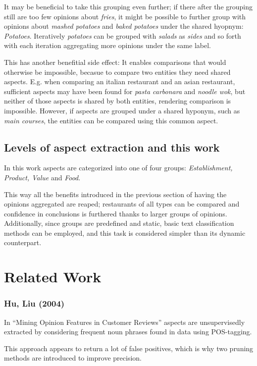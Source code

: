 \documentclass[a4paper,11pt]{kth-mag}
\begin{document}

It may be beneficial to take this grouping even further;
if there after the grouping still are too few opinions about \emph{fries},
it might be possible to further group with opinions about \emph{mashed potatoes}
and \emph{baked potatoes} under the shared hyopnym: \emph{Potatoes}.
Iteratively \emph{potatoes} can be grouped with \emph{salads} as \emph{sides}
and so forth with each iteration aggregating more opinions under the same label.

This has another benefitial side effect: It enables comparisons that would otherwise
be impossible, becasue to compare two entities they need shared aspects.
E.g. when comparing an italian restaurant and an asian restaurant, sufficient aspects may
have been found for \emph{pasta carbonara} and \emph{noodle wok}, but neither of
those aspects is shared by both entities, rendering comparison is impossible.
However, if aspects are grouped under a shared hyponym, such as \emph{main courses},
the entities can be compared using this common aspect.


\subsection{Levels of aspect extraction and this work}
In this work aspects are categorized into one of four groups:
\emph{Establishment, Product, Value} and \emph{Food}.

This way all the benefits introduced in the previous section of having the opinions
aggregated are reaped; restaurants of all types can be compared and confidence in conclusions
is furthered thanks to larger groups of opinions.
Additionally, since groups are predefined and static, basic text classification methods can be employed,
and this task is considered simpler than its dynamic counterpart.


\section{Related Work}

\subsubsection{Hu, Liu (2004)}
In ``Mining Opinion Features in Customer Reviews'' aspects are unsupervisedly
extracted by considering frequent noun phrases found in data using POS-tagging.

This approach appears to return a lot of false positives, which is why two pruning
methods are introduced to improve precision.
\end{document}
